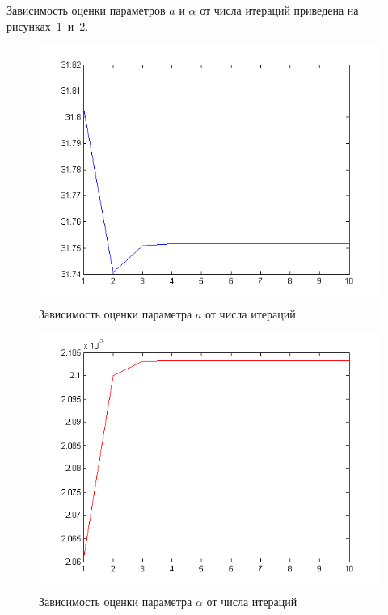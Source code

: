 Зависимость оценки параметров $ a $ и $ \alpha $ от числа итераций приведена
на рисунках~\ref{pic:a_per_iter}~и~\ref{pic:alpha_per_iter}.
\begin{figure}[h!]
  \centering
  \includegraphics[width=0.77\linewidth]{pic/a_per_iter}
  \caption{Зависимость оценки параметра $ a $ от числа итераций}
  \label{pic:a_per_iter}
\end{figure}
\begin{figure}[h!]
  \centering
  \includegraphics[width=0.77\linewidth]{pic/alpha_per_iter}
  \caption{Зависимость оценки параметра $ \alpha $ от числа итераций}
  \label{pic:alpha_per_iter}
\end{figure}
